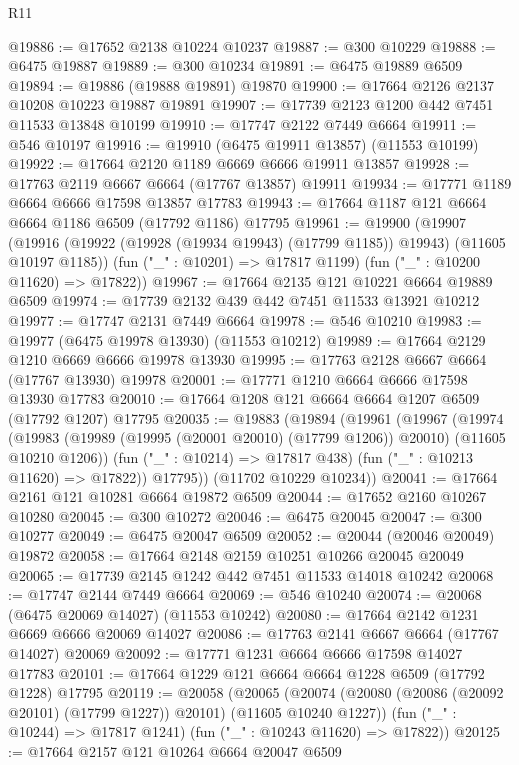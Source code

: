 \begin{lexlean}{R11}
\begin{coremodule}
{{{{{{{{{{{{{{{{{{{{{{{{{{{{{{{{{{{{{{{{{{{{{{{{{{{{{{{{{{{{{{{{{{{{{{{{{{{{{{{{{{@19886 := @17652 @2138 @10224 @10237
@19887 := @300 @10229
@19888 := @6475 @19887
@19889 := @300 @10234
@19891 := @6475 @19889 @6509
@19894 := @19886 (@19888 @19891) @19870
@19900 := @17664 @2126 @2137 @10208 @10223 @19887 @19891
@19907 := @17739 @2123 @1200 @442 @7451 @11533 @13848 @10199
@19910 := @17747 @2122 @7449 @6664
@19911 := @546 @10197
@19916 := @19910 (@6475 @19911 @13857) (@11553 @10199)
@19922 := @17664 @2120 @1189 @6669 @6666 @19911 @13857
@19928 := @17763 @2119 @6667 @6664 (@17767 @13857) @19911
@19934 := @17771 @1189 @6664 @6666 @17598 @13857 @17783
@19943 := @17664 @1187 @121 @6664 @6664 @1186 @6509 (@17792 @1186) @17795
@19961 := @19900
    (@19907
      (@19916 (@19922 (@19928 (@19934 @19943) (@17799 @1185)) @19943) (@11605 @10197 @1185))
      (fun ("_" : @10201) => @17817 @1199)
      (fun ("_" : @10200 @11620) => @17822))
@19967 := @17664 @2135 @121 @10221 @6664 @19889 @6509
@19974 := @17739 @2132 @439 @442 @7451 @11533 @13921 @10212
@19977 := @17747 @2131 @7449 @6664
@19978 := @546 @10210
@19983 := @19977 (@6475 @19978 @13930) (@11553 @10212)
@19989 := @17664 @2129 @1210 @6669 @6666 @19978 @13930
@19995 := @17763 @2128 @6667 @6664 (@17767 @13930) @19978
@20001 := @17771 @1210 @6664 @6666 @17598 @13930 @17783
@20010 := @17664 @1208 @121 @6664 @6664 @1207 @6509 (@17792 @1207) @17795
@20035 := @19883
    (@19894
      (@19961
        (@19967
          (@19974
            (@19983 (@19989 (@19995 (@20001 @20010) (@17799 @1206)) @20010) (@11605 @10210 @1206))
            (fun ("_" : @10214) => @17817 @438)
            (fun ("_" : @10213 @11620) => @17822))
          @17795))
      (@11702 @10229 @10234))
@20041 := @17664 @2161 @121 @10281 @6664 @19872 @6509
@20044 := @17652 @2160 @10267 @10280
@20045 := @300 @10272
@20046 := @6475 @20045
@20047 := @300 @10277
@20049 := @6475 @20047 @6509
@20052 := @20044 (@20046 @20049) @19872
@20058 := @17664 @2148 @2159 @10251 @10266 @20045 @20049
@20065 := @17739 @2145 @1242 @442 @7451 @11533 @14018 @10242
@20068 := @17747 @2144 @7449 @6664
@20069 := @546 @10240
@20074 := @20068 (@6475 @20069 @14027) (@11553 @10242)
@20080 := @17664 @2142 @1231 @6669 @6666 @20069 @14027
@20086 := @17763 @2141 @6667 @6664 (@17767 @14027) @20069
@20092 := @17771 @1231 @6664 @6666 @17598 @14027 @17783
@20101 := @17664 @1229 @121 @6664 @6664 @1228 @6509 (@17792 @1228) @17795
@20119 := @20058
    (@20065
      (@20074 (@20080 (@20086 (@20092 @20101) (@17799 @1227)) @20101) (@11605 @10240 @1227))
      (fun ("_" : @10244) => @17817 @1241)
      (fun ("_" : @10243 @11620) => @17822))
@20125 := @17664 @2157 @121 @10264 @6664 @20047 @6509
}}}}}}}}}}}}}}}}}}}}}}}}}}}}}}}}}}}}}}}}}}}}}}}}}}}}}}}}}}}}}}}}}}}}}}}}}}}}}}}}}}
\end{coremodule}
\end{lexlean}
